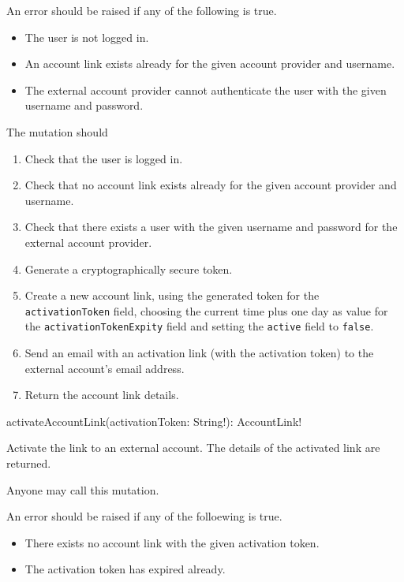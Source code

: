 An error should be raised if any of the following is true.

\begin{itemize}
    \item The user is not logged in.
    \item An account link exists already for the given account provider and username.
    \item The external account provider cannot authenticate the user with the given username and password.
\end{itemize}

\functionality

The mutation should

\begin{enumerate}
    \item Check that the user is logged in.
    \item Check that no account link exists already for the given account provider and username.
    \item Check that there exists a user with the given username and password for the external account provider.
    \item Generate a cryptographically secure token.
    \item Create a new account link, using the generated token for the \verb|activationToken| field, choosing the current time plus one day as value for the \verb|activationTokenExpity| field and setting the \verb|active| field to \verb|false|.
    \item Send an email with an activation link (with the activation token) to the external account's email address.
    \item Return the account link details.
\end{enumerate}


\begin{code}
activateAccountLink(activationToken: String!): AccountLink!
\end{code}

Activate the link to an external account. The details of the activated link are returned.

\restrictions

Anyone may call this mutation.

\errors

An error should be raised if any of the folloewing is true.

\begin{itemize}
    \item There exists no account link with the given activation token.
    \item The activation token has expired already.
\end{itemize}

